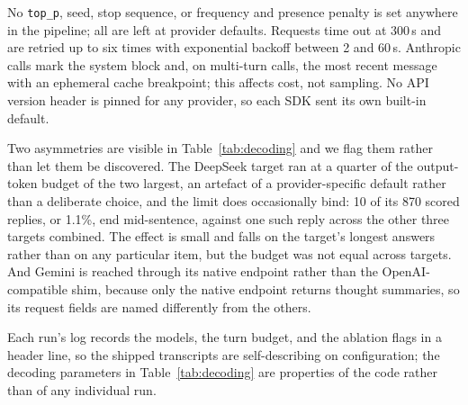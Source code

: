 No \texttt{top\_p}, seed, stop sequence, or frequency and presence penalty is
set anywhere in the pipeline; all are left at provider defaults. Requests time
out at 300\,s and are retried up to six times with exponential backoff between
2 and 60\,s. Anthropic calls mark the system block and, on multi-turn calls, the
most recent message with an ephemeral cache breakpoint; this affects cost, not
sampling. No API version header is pinned for any provider, so each SDK sent its
own built-in default.

Two asymmetries are visible in Table~\ref{tab:decoding} and we flag them rather
than let them be discovered. The DeepSeek target ran at a quarter of the
output-token budget of the two largest, an artefact of a provider-specific
default rather than a deliberate choice, and the limit does occasionally bind:
10 of its 870 scored replies, or 1.1\%, end mid-sentence, against one such reply
across the other three targets combined. The effect is small and falls on the
target's longest answers rather than on any particular item, but the budget was
not equal across targets. And Gemini is reached through its native
endpoint rather than the OpenAI-compatible shim, because only the native
endpoint returns thought summaries, so its request fields are named differently
from the others.

Each run's log records the models, the turn budget, and the ablation flags in a
header line, so the shipped transcripts are self-describing on configuration;
the decoding parameters in Table~\ref{tab:decoding} are properties of the code
rather than of any individual run.


